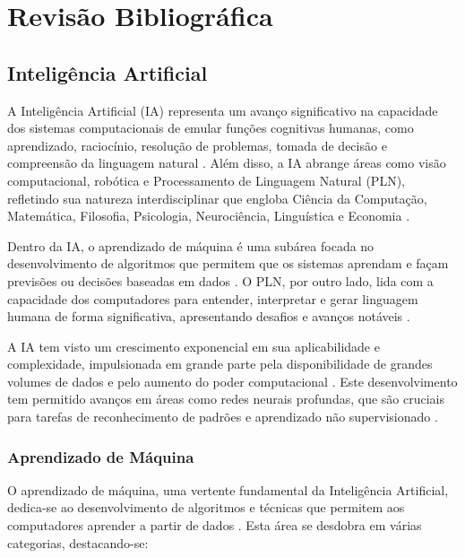 \documentclass[conference]{IEEEtran}
\begin{document}
\section{Revisão Bibliográfica}

\subsection{Inteligência Artificial}
A Inteligência Artificial (IA) representa um avanço significativo na capacidade 
dos sistemas computacionais de emular funções cognitivas humanas, como 
aprendizado, raciocínio, resolução de problemas, tomada de decisão 
e compreensão da linguagem natural \cite{Russell2016}. 
Além disso, a IA abrange áreas como visão computacional, robótica e 
Processamento de Linguagem Natural (PLN), refletindo sua natureza interdisciplinar 
que engloba Ciência da Computação, Matemática, Filosofia, Psicologia, 
Neurociência, Linguística e Economia \cite{Poole2010}.

Dentro da IA, o aprendizado de máquina é uma subárea focada no desenvolvimento de 
algoritmos que permitem que os sistemas aprendam e 
façam previsões ou decisões baseadas em dados \cite{Alpaydin2020}. 
O PLN, por outro lado, lida com a capacidade dos computadores para entender, 
interpretar e gerar linguagem humana de forma significativa, 
apresentando desafios e avanços notáveis \cite{Jurafsky2020}.

A IA tem visto um crescimento exponencial em sua aplicabilidade e complexidade, 
impulsionada em grande parte pela disponibilidade de grandes volumes de dados e 
pelo aumento do poder computacional \cite{Goodfellow2016}. 
Este desenvolvimento tem permitido avanços em áreas como redes neurais profundas, 
que são cruciais para tarefas de reconhecimento de padrões 
e aprendizado não supervisionado \cite{LeCun2015}.

\subsubsection{Aprendizado de Máquina} 

O aprendizado de máquina, uma vertente fundamental da Inteligência Artificial, 
dedica-se ao desenvolvimento de algoritmos e técnicas que permitem aos computadores 
aprender a partir de dados \cite{Bishop2006}. 
Esta área se desdobra em várias categorias, destacando-se:
\end{document}
